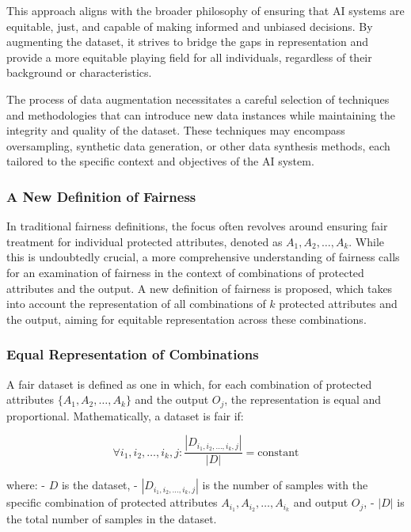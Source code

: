 \documentclass[12pt,a4paper,openright,twoside]{book}
\begin{document}
This approach aligns with the broader philosophy of ensuring that AI systems are equitable, just, and capable of making informed and unbiased decisions. By augmenting the dataset, it strives to bridge the gaps in representation and provide a more equitable playing field for all individuals, regardless of their background or characteristics. 

The process of data augmentation necessitates a careful selection of techniques and methodologies that can introduce new data instances while maintaining the integrity and quality of the dataset. These techniques may encompass oversampling, synthetic data generation, or other data synthesis methods, each tailored to the specific context and objectives of the AI system.

\subsubsection{A New Definition of Fairness}

In traditional fairness definitions, the focus often revolves around ensuring fair treatment for individual protected attributes, denoted as $A_1, A_2, \ldots, A_k$. While this is undoubtedly crucial, a more comprehensive understanding of fairness calls for an examination of fairness in the context of combinations of protected attributes and the output. A new definition of fairness is proposed, which takes into account the representation of all combinations of $k$ protected attributes and the output, aiming for equitable representation across these combinations.

\subsubsection{Equal Representation of Combinations}

A fair dataset is defined as one in which, for each combination of protected attributes $\{A_1, A_2, \ldots, A_k\}$ and the output $O_j$, the representation is equal and proportional. Mathematically, a dataset is fair if:

\[
\forall i_1, i_2, \ldots, i_k, j: \frac{|D_{i_1, i_2, \ldots, i_k, j}|}{|D|} = \text{constant}
\]

where:
- $D$ is the dataset,
- $|D_{i_1, i_2, \ldots, i_k, j}|$ is the number of samples with the specific combination of protected attributes $A_{i_1}, A_{i_2}, \ldots, A_{i_k}$ and output $O_j$,
- $|D|$ is the total number of samples in the dataset.
\end{document}
